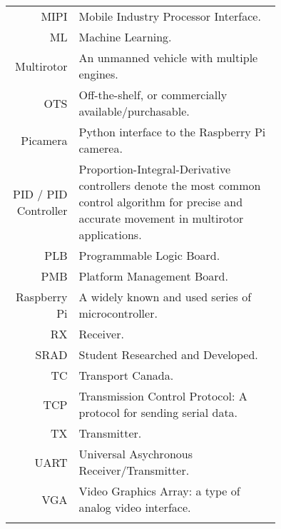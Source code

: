 \begin{tabular}[h]{rp{0.75\linewidth}}
    MIPI & Mobile Industry Processor Interface. \\
    ML & Machine Learning.\\
    Multirotor & An unmanned vehicle with multiple engines. \\
    OTS & Off-the-shelf, or commercially available/purchasable. \\
    Picamera & Python interface to the Raspberry Pi camerea. \\
    PID / PID Controller & Proportion-Integral-Derivative controllers denote the most common control algorithm for precise and accurate movement in multirotor applications.\\
    PLB & Programmable Logic Board. \\
    PMB & Platform Management Board. \\
    Raspberry Pi & A widely known and used series of microcontroller. \\
    RX & Receiver.\\
    SRAD & Student Researched and Developed.\\
    TC & Transport Canada.\\
    TCP & Transmission Control Protocol: A protocol for sending serial data. \\
    TX & Transmitter.\\\
    UART & Universal Asychronous Receiver/Transmitter. \\
    VGA & Video Graphics Array: a type of analog video interface. \\
     & \\

    \hline

\end{tabular}
